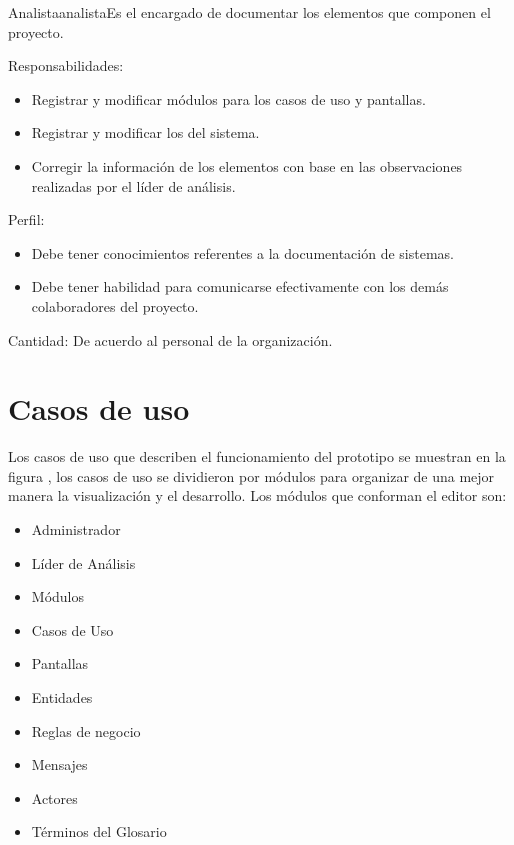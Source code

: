 \begin{actor}{Analista}{analista}{Es el encargado de documentar los elementos que componen el proyecto.}
    \item[Responsabilidades:] \hspace{1pt}
    \begin{itemize}
	\item Registrar y modificar módulos para los casos de uso y pantallas.
	\item Registrar y modificar los  del sistema.
	\item Corregir la información de los elementos con base en las observaciones realizadas por el líder de análisis.
    \end{itemize}
    \item[Perfil:] \hspace{1pt}
    \begin{itemize}
	\item Debe tener conocimientos referentes a la documentación de sistemas.
	\item Debe tener habilidad para comunicarse efectivamente con los demás colaboradores del proyecto.
    \end{itemize}
    \item[Cantidad:] De acuerdo al personal de la organización.
\end{actor}


\clearpage
\section{Casos de uso}
Los casos de uso que describen el funcionamiento del prototipo se muestran en la figura , 
los casos de uso se dividieron por módulos para organizar de una mejor manera la visualización y el desarrollo. Los módulos
que conforman el editor son:
\begin{itemize}
	\item Administrador
	\item Líder de Análisis
	\item Módulos
	\item Casos de Uso
	\item Pantallas
	\item Entidades
	\item Reglas de negocio
	\item Mensajes
	\item Actores
	\item Términos del Glosario
\end{itemize}

